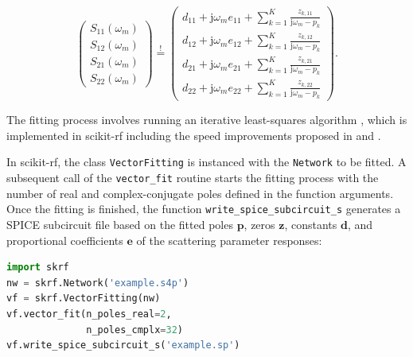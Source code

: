 \documentclass{IEEEjmw}
\begin{document}
\begin{equation}
\begin{pmatrix}
S_{11} (\omega_m) \\
S_{12} (\omega_m) \\
S_{21} (\omega_m) \\
S_{22} (\omega_m)
\end{pmatrix} 
\overset{!}{=}
\begin{pmatrix}
d_{11} + \mathrm{j} \omega_m e_{11} + \sum _{k=1} ^{K} \frac{z_{k,11}}{\mathrm{j} \omega_m - p_k} \\
d_{12} + \mathrm{j} \omega_m e_{12} + \sum _{k=1} ^{K} \frac{z_{k,12}}{\mathrm{j} \omega_m - p_k} \\
d_{21} + \mathrm{j} \omega_m e_{21} + \sum _{k=1} ^{K} \frac{z_{k,21}}{\mathrm{j} \omega_m - p_k} \\
d_{22} + \mathrm{j} \omega_m e_{22} + \sum _{k=1} ^{K} \frac{z_{k,22}}{\mathrm{j} \omega_m - p_k}
\end{pmatrix} .
\end{equation}

The fitting process involves running an iterative least-squares algorithm \cite{vectfit}, which is implemented in scikit-rf including the speed improvements proposed in \cite{vectfit_improved} and \cite{vectfit_fast}.

In scikit-rf, the class \texttt{VectorFitting} is instanced with the \texttt{Network} to be fitted. A subsequent call of the \texttt{vector\_fit} routine starts the fitting process with the number of real and complex-conjugate poles defined in the function arguments. Once the fitting is finished, the function \texttt{write\_spice\_subcircuit\_s} generates a SPICE subcircuit file based on the fitted poles $\mathbf{p}$, zeros $\mathbf{z}$, constants $\mathbf{d}$, and proportional coefficients $\mathbf{e}$ of the scattering parameter responses:

\begin{lstlisting}[language=Python]
import skrf
nw = skrf.Network('example.s4p')
vf = skrf.VectorFitting(nw)
vf.vector_fit(n_poles_real=2, 
              n_poles_cmplx=32)
vf.write_spice_subcircuit_s('example.sp')
\end{lstlisting}
\end{document}
